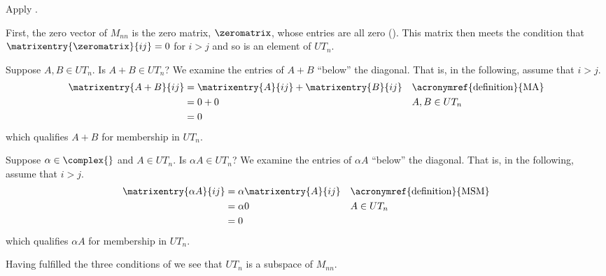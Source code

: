 Apply .\par
%
First, the zero vector of $M_{nn}$ is the zero matrix, $\zeromatrix$, whose entries are all zero ().  This matrix then meets the condition that $\matrixentry{\zeromatrix}{ij}=0$ for $i>j$ and so is an element of $UT_n$.\par
%
Suppose $A,B\in UT_n$.  Is $A+B\in UT_n$?  We examine the entries of $A+B$ ``below'' the diagonal.  That is, in the following, assume that $i>j$.
%
\begin{align*}
\matrixentry{A+B}{ij}
&=\matrixentry{A}{ij}+\matrixentry{B}{ij}&&\text{\acronymref{definition}{MA}}\\
&=0 + 0&&\text{$A,B\in UT_n$}\\
&=0
\end{align*}
%
which qualifies $A+B$ for membership in $UT_n$.\par
%
Suppose $\alpha\in\complex{}$ and $A\in UT_n$.  Is $\alpha A\in UT_n$?  We examine the entries of $\alpha A$ ``below'' the diagonal.  That is, in the following, assume that $i>j$.
%
\begin{align*}
\matrixentry{\alpha A}{ij}
&=\alpha\matrixentry{A}{ij}&&\text{\acronymref{definition}{MSM}}\\
&=\alpha 0&&\text{$A\in UT_n$}\\
&=0
\end{align*}
%
which qualifies $\alpha A$ for membership in $UT_n$.\par
%
Having fulfilled the three conditions of  we see that $UT_n$ is a subspace of $M_{nn}$.